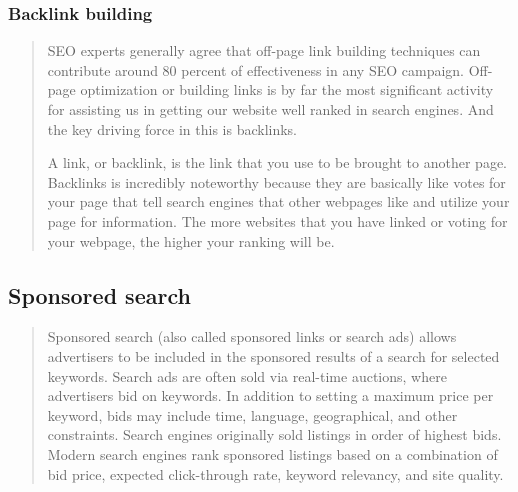 \documentclass[35pt]{report}
\begin{document}
		\subsubsection{Backlink building}
\begin{quote}
SEO experts generally agree that off-page link building techniques can contribute around 80 percent of effectiveness in any SEO campaign. Off-page optimization or building links is by far the most significant activity for assisting us in getting our website well ranked in search engines. And the key driving force in this is backlinks.

A link, or backlink, is the link that you use to be brought to another page. Backlinks is incredibly noteworthy because they are basically like votes for your page that tell search engines that other webpages like and utilize your page for information. The more websites that you have linked or voting for your webpage, the higher your ranking will be. 
\end{quote}

			\subsection{Sponsored search}
			\begin{quote}
			Sponsored search (also called sponsored links or search ads) allows advertisers to be included in the sponsored results of a search for selected keywords. Search ads are often sold via real-time auctions, where advertisers bid on keywords. In addition to setting a maximum price per keyword, bids may include time, language, geographical, and other constraints. Search engines originally sold listings in order of highest bids. Modern search engines rank sponsored listings based on a combination of bid price, expected click-through rate, keyword relevancy, and site quality.
			\end{quote}
\end{document}
